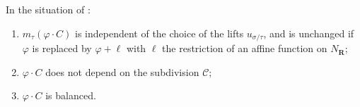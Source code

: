 \begin{lemma}
\label{lem:ch18-corner-welldefined}
In the situation of :
\begin{enumerate}
\item\label{itm:ch18-cc:affine}
 $m_\tau(\varphi\cdot C)$ is independent of the choice of the lifts
 $u_{\sigma/\tau}$, and is unchanged if $\varphi$ is replaced by
 $\varphi+\ell$ with $\ell$ the restriction of an affine function on
 $N_{\mathbf R}$;
\item\label{itm:ch18-cc:subdiv}
 $\varphi\cdot C$ does not depend on the subdivision $\mathscr C$;
\item\label{itm:ch18-cc:balanced}
 $\varphi\cdot C$ is balanced.
\end{enumerate}
\end{lemma}

